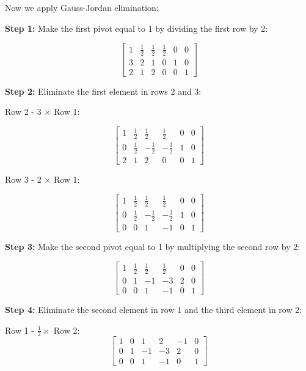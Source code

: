 Now we apply Gauss-Jordan elimination:

\textbf{Step 1:} Make the first pivot equal to 1 by dividing the first row by 2:

\[
    \left[
    \begin{array}{ccc|ccc}
        1 & \frac{1}{2} & \frac{1}{2} & \frac{1}{2} & 0 & 0 \\
        3 & 2           & 1           & 0           & 1 & 0 \\
        2 & 1           & 2           & 0           & 0 & 1
    \end{array}
    \right]
\]

\textbf{Step 2:} Eliminate the first element in rows 2 and 3:

Row 2 - 3 \(\times\) Row 1:

\[
    \left[
    \begin{array}{ccc|ccc}
        1 & \frac{1}{2} & \frac{1}{2}  & \frac{1}{2}  & 0 & 0 \\
        0 & \frac{1}{2} & -\frac{1}{2} & -\frac{3}{2} & 1 & 0 \\
        2 & 1           & 2            & 0            & 0 & 1
    \end{array}
    \right]
\]

Row 3 - 2 \(\times\) Row 1:

\[
    \left[
    \begin{array}{ccc|ccc}
        1 & \frac{1}{2} & \frac{1}{2}  & \frac{1}{2}  & 0 & 0 \\
        0 & \frac{1}{2} & -\frac{1}{2} & -\frac{3}{2} & 1 & 0 \\
        0 & 0           & 1            & -1           & 0 & 1
    \end{array}
    \right]
\]

\textbf{Step 3:} Make the second pivot equal to 1 by multiplying the second row by 2:

\[
    \left[
    \begin{array}{ccc|ccc}
        1 & \frac{1}{2} & \frac{1}{2} & \frac{1}{2} & 0 & 0 \\
        0 & 1           & -1          & -3          & 2 & 0 \\
        0 & 0           & 1           & -1          & 0 & 1
    \end{array}
    \right]
\]

\textbf{Step 4:} Eliminate the second element in row 1 and the third element in row 2:

Row 1 - \(\frac{1}{2} \times\) Row 2:
\[
    \left[
    \begin{array}{ccc|ccc}
        1 & 0 & 1  & 2  & -1 & 0 \\
        0 & 1 & -1 & -3 & 2  & 0 \\
        0 & 0 & 1  & -1 & 0  & 1
    \end{array}
    \right]
\]

